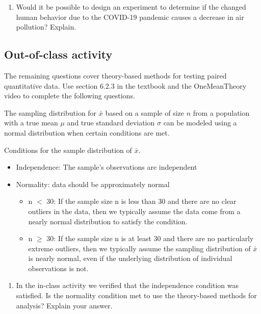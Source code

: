 \documentclass[
]{report}
\providecommand{\tightlist}{%
  \setlength{\itemsep}{0pt}\setlength{\parskip}{0pt}}
\begin{document}
\begin{enumerate}
\def\labelenumi{\arabic{enumi}.}
\setcounter{enumi}{23}
\tightlist
\item
  Would it be possible to design an experiment to determine if the changed human behavior due to the COVID-19 pandemic causes a decrease in air pollution? Explain.
  \vspace{0.6in}
\end{enumerate}

\hypertarget{out-of-class-activity-9}{%
\subsection{Out-of-class activity}\label{out-of-class-activity-9}}

The remaining questions cover theory-based methods for testing paired quantitative data. Use section 6.2.3 in the textbook and the OneMeanTheory video to complete the following questions.

The sampling distribution for \(\bar{x}\) based on a sample of size \(n\) from a population with a true mean \(\mu\) and true standard deviation \(\sigma\) can be modeled using a normal distribution when certain conditions are met.

Conditions for the sample distribution of \(\bar{x}\).

\begin{itemize}
\item
  Independence: The sample's observations are independent
\item
  Normality: data should be approximately normal

  \begin{itemize}
  \item
    n \(<\) 30: If the sample size n is less than 30 and there are no clear outliers in the data, then we typically assume the data come from a nearly normal distribution to satisfy the condition.
  \item
    n \(\geq\) 30: If the sample size n is at least 30 and there are no particularly extreme outliers, then we typically assume the sampling distribution of \(\bar{x}\) is nearly normal, even if the underlying distribution of individual observations is not.
  \end{itemize}
\end{itemize}

\begin{enumerate}
\def\labelenumi{\arabic{enumi}.}
\tightlist
\item
  In the in-class activity we verified that the independence condition was satisfied. Is the normality condition met to use the theory-based methods for analysis? Explain your answer.
\end{enumerate}
\end{document}
